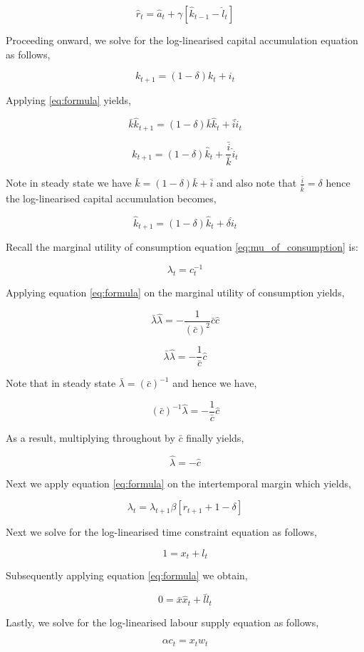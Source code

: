 \documentclass[
  11pt,
  justified]{article}
\begin{document}
\[
\hat r_t = \hat a_t + \gamma[\hat k_{t-1} - \hat l_t]
\]

Proceeding onward, we solve for the log-linearised capital accumulation
equation as follows,

\[
k_{t+1} = (1-\delta) k_t + i_t
\]

Applying \ref{eq:formula} yields,

\[
\bar k \hat k_{t+1} = (1-\delta) \bar k \hat k_t + \bar i \hat i_t
\]

\[
\hat k_{t+1} = (1-\delta) \hat k_t + \frac{\bar i}{\bar k} \hat i_t
\]

Note in steady state we have \(\bar k = (1-\delta) \bar k + \bar i\) and
also note that \(\frac{\bar i}{\bar k} = \delta\) hence the
log-linearised capital accumulation becomes,

\[
\hat k_{t+1} = (1-\delta) \hat k_t + \delta \hat i_t
\]

Recall the marginal utility of consumption equation
\ref{eq:mu_of_consumption} is:

\[
\lambda_t = c_t^{-1}
\]

Applying equation \ref{eq:formula} on the marginal utility of
consumption yields,

\[
\bar \lambda \hat \lambda = - \frac{1}{(\bar c)^2} \bar c \hat c 
\]

\[
\bar \lambda \hat \lambda = - \frac{1}{\bar c} \hat c 
\]

Note that in steady state \(\bar \lambda = (\bar c)^{-1}\) and hence we
have,

\[
(\bar c)^{-1} \hat \lambda = - \frac{1}{\bar c} \hat c 
\]

As a result, multiplying throughout by \(\bar c\) finally yields,

\[
\hat \lambda = - \hat c
\]

Next we apply equation \ref{eq:formula} on the intertemporal margin
which yields,

\[
\lambda_t = \lambda_{t+1} \beta[r_{t+1} + 1 - \delta]
\]

Next we solve for the log-linearised time constraint equation as
follows,

\[
1 = x_t + l_t
\]

Subsequently applying equation \ref{eq:formula} we obtain,

\[
0 = \bar x \hat x_t + \bar l \hat l_t
\]

Lastly, we solve for the log-linearised labour supply equation as
follows,

\[
\alpha c_t = x_t w_t
\]
\end{document}
